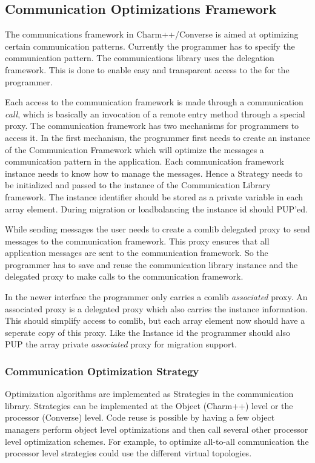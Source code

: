 \subsection{Communication Optimizations Framework}

The communications framework in Charm++/Converse is aimed at
optimizing certain communication patterns. Currently the programmer
has to specify the communication pattern. The communications library
uses the delegation framework. This is done to enable easy and transparent 
access to the for the programmer.


Each access to the communication framework is made through a communication 
{\em call}, which is basically an invocation of a remote entry method through 
a special proxy. The communication framework has two mechanisms for 
programmers to access it. In the first mechanism, the programmer first 
needs to create an instance of the Communication Framework which will optimize the 
messages a communication pattern in the application. Each communication framework
instance needs to know how to manage the messages. Hence a Strategy
needs to be initialized and passed to the instance of the
Communication Library framework. The instance identifier should be stored as a 
private variable in each array element. During migration or loadbalancing the 
instance id should PUP'ed.

While sending messages the user needs to create a 
comlib delegated proxy to send messages to the communication framework. This proxy 
ensures that all application messages are sent to the communication framework.
So the programmer has to save and reuse the communication library instance and the 
delegated proxy to make calls to the communication framework.

In the newer interface the programmer only carries a comlib {\em associated} proxy. 
An associated proxy is a delegated proxy which also carries the instance information. 
This should simplify access to comlib, but each array element now should have a seperate 
copy of this proxy. Like the Instance id the programmer should also PUP the array private 
{\em associated} proxy for migration support.

\subsubsection{Communication Optimization Strategy}

Optimization algorithms are implemented as Strategies in the
communication library. Strategies can be implemented at the Object
(Charm++) level or the processor (Converse) level. Code reuse is
possible by having a few object managers perform object level
optimizations and then call several other processor level optimization
schemes. For example, to optimize all-to-all communication the
processor level strategies could use the different virtual topologies.

